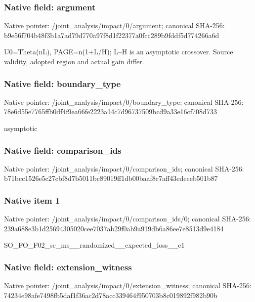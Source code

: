 \documentclass[10pt,a4paper]{article}
\begin{document}
\subsubsection{Native field: argument}
Native pointer: /joint\_\allowbreak{}analysis/impact/0/argument; canonical SHA-256: b9e56f704b48f3b1a7ad79d770a97f8d1f22377a0fcc289b9fddf5d774266a6d

\begingroup\raggedright\sloppy U0=\allowbreak{}Theta(nL),\allowbreak{} PAGE=\allowbreak{}n(1+L/\allowbreak{}H);\allowbreak{} L\textasciitilde{}H is an asymptotic crossover. Source validity,\allowbreak{} adopted region and actual gain differ.\par\endgroup

\subsubsection{Native field: boundary\_\allowbreak{}type}
Native pointer: /joint\_\allowbreak{}analysis/impact/0/boundary\_\allowbreak{}type; canonical SHA-256: 78e6d55e7765ffb0df4f9ea66fe2223a14c7d96737509bcd9a33e16cf708d733

\begingroup\raggedright\sloppy asymptotic\par\endgroup

\subsubsection{Native field: comparison\_\allowbreak{}ids}
Native pointer: /joint\_\allowbreak{}analysis/impact/0/comparison\_\allowbreak{}ids; canonical SHA-256: b71bcc1526e5c27cbf8d7b5011bc89019ff1db00baaf8c7aff43edeeeb501b87

\subsubsection{Native item 1}
Native pointer: /joint\_\allowbreak{}analysis/impact/0/comparison\_\allowbreak{}ids/0; canonical SHA-256: 239a688e3b1d25694305020cee7037ab29f0ab9a919db6a86ee7e8513d9e4184

\begingroup\raggedright\sloppy SO\_\allowbreak{}FO\_\allowbreak{}F02\_\allowbreak{}sc\_\allowbreak{}ms\_\allowbreak{}\_\allowbreak{}randomized\_\allowbreak{}\_\allowbreak{}expected\_\allowbreak{}loss\_\allowbreak{}\_\allowbreak{}c1\par\endgroup

\subsubsection{Native field: extension\_\allowbreak{}witness}
Native pointer: /joint\_\allowbreak{}analysis/impact/0/extension\_\allowbreak{}witness; canonical SHA-256: 74234e98afe7498fb5daf1f36ac2d78acc339464f950703b8c019892f982b90b
\end{document}
